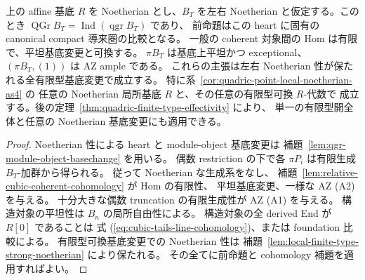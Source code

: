 \begin{corollary}
\label{cor:quadric-noetherian-base-recognition}
上の affine 基底 $R$ を Noetherian とし、$B_T$ を左右 Noetherian
と仮定する。このとき
$\operatorname{QGr}B_T=\operatorname{Ind}(\operatorname{qgr}B_T)$ であり、
前命題はこの heart に固有の canonical compact 導来圏の比較となる。
一般の coherent 対象間の Hom は有限で、平坦基底変更と可換する。
$\pi B_T$ は基底上平坦かつ exceptional、$(\pi B_T,(1))$ は AZ ample である。
これらの主張は左右 Noetherian 性が保たれる全有限型基底変更で成立する。
特に系~\ref{cor:quadric-point-local-noetherian-as4} の
任意の Noetherian 局所基底 $R$ と、その任意の有限型可換 $R$-代数で
成立する。後の定理~\ref{thm:quadric-finite-type-effectivity} により、
単一の有限型開全体と任意の Noetherian 基底変更にも適用できる。
\end{corollary}
\begin{proof}
Noetherian 性による heart と module-object 基底変更は
補題~\ref{lem:qgr-module-object-basechange} を用いる。
偶数 restriction の下で各 $\pi P_i$ は有限生成 $B_T$-加群から得られる。
従って Noetherian な生成系をなし、
補題~\ref{lem:relative-cubic-coherent-cohomology} が Hom の有限性、
平坦基底変更、一様な AZ (A2) を与える。
十分大きな偶数 truncation の有限生成性が AZ (A1) を与える。
構造対象の平坦性は $B_n$ の局所自由性による。
構造対象の全 derived End が $R[0]$ であることは
式 (\ref{eq:cubic-tails-line-cohomology})、または foundation 比較による。
有限型可換基底変更での Noetherian 性は
補題~\ref{lem:local-finite-type-strong-noetherian} により保たれる。
その全てに前命題と cohomology 補題を適用すればよい。
\end{proof}

